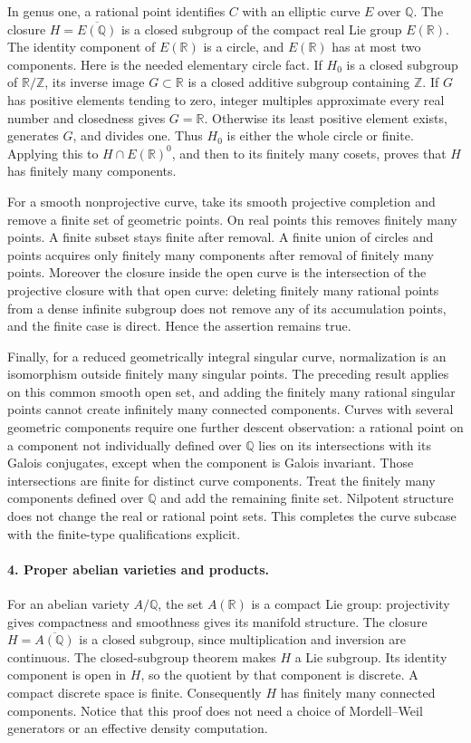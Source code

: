 \documentclass[11pt]{article}
\begin{document}
In genus one, a rational point identifies $C$ with an elliptic curve $E$ over $\mathbb Q$. The closure $H=\overline{E(\mathbb Q)}$ is a closed subgroup of the compact real Lie group $E(\mathbb R)$. The identity component of $E(\mathbb R)$ is a circle, and $E(\mathbb R)$ has at most two components. Here is the needed elementary circle fact. If $H_0$ is a closed subgroup of $\mathbb R/\mathbb Z$, its inverse image $G\subset\mathbb R$ is a closed additive subgroup containing $\mathbb Z$. If $G$ has positive elements tending to zero, integer multiples approximate every real number and closedness gives $G=\mathbb R$. Otherwise its least positive element exists, generates $G$, and divides one. Thus $H_0$ is either the whole circle or finite. Applying this to $H\cap E(\mathbb R)^0$, and then to its finitely many cosets, proves that $H$ has finitely many components.

For a smooth nonprojective curve, take its smooth projective completion and remove a finite set of geometric points. On real points this removes finitely many points. A finite subset stays finite after removal. A finite union of circles and points acquires only finitely many components after removal of finitely many points. Moreover the closure inside the open curve is the intersection of the projective closure with that open curve: deleting finitely many rational points from a dense infinite subgroup does not remove any of its accumulation points, and the finite case is direct. Hence the assertion remains true.

Finally, for a reduced geometrically integral singular curve, normalization is an isomorphism outside finitely many singular points. The preceding result applies on this common smooth open set, and adding the finitely many rational singular points cannot create infinitely many connected components. Curves with several geometric components require one further descent observation: a rational point on a component not individually defined over $\mathbb Q$ lies on its intersections with its Galois conjugates, except when the component is Galois invariant. Those intersections are finite for distinct curve components. Treat the finitely many components defined over $\mathbb Q$ and add the remaining finite set. Nilpotent structure does not change the real or rational point sets. This completes the curve subcase with the finite-type qualifications explicit.

\paragraph{4. Proper abelian varieties and products.}
For an abelian variety $A/\mathbb Q$, the set $A(\mathbb R)$ is a compact Lie group: projectivity gives compactness and smoothness gives its manifold structure. The closure $H=\overline{A(\mathbb Q)}$ is a closed subgroup, since multiplication and inversion are continuous. The closed-subgroup theorem makes $H$ a Lie subgroup. Its identity component is open in $H$, so the quotient by that component is discrete. A compact discrete space is finite. Consequently $H$ has finitely many connected components. Notice that this proof does not need a choice of Mordell--Weil generators or an effective density computation.
\end{document}
